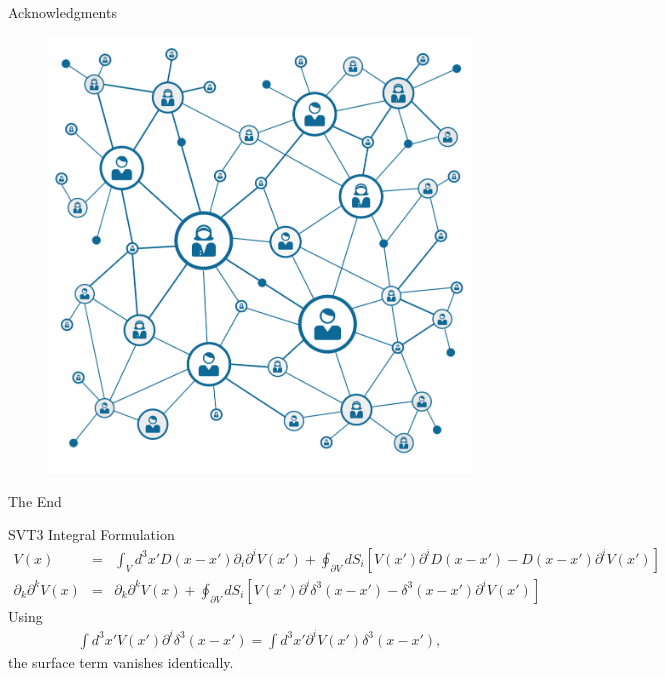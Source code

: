 \documentclass[8pt,aspectratio=1610]{beamer}
\begin{document}
\begin{frame}{Acknowledgments}
	\begin{figure}
		\includegraphics[width=0.35\linewidth]{network.png}
	\end{figure}
	\let\thefootnote\relax{}
\end{frame}


\begin{frame}{}
	\begin{center}
		\Large{The End}
	\end{center}
\end{frame}

\appendix


\begin{frame}{SVT3 Integral Formulation}
	\begin{eqnarray}
	V(x) &=&\int_V d^3x' D(x-x')\partial_i \partial^i V(x') + \oint_{\partial V} dS_i[V(x')\partial^i D(x-x') - D(x-x')\partial^i V(x')]
	\\ 
	\partial_k \partial^k V(x) &=& \partial_k \partial^k V(x) + \oint_{\partial V} dS_i[V(x')\partial^i \delta^3(x-x') - \delta^3(x-x')\partial^i V(x')]
	\end{eqnarray}
	Using 
	\begin{eqnarray}
	\int d^3x' V(x') \partial^i \delta^3(x-x') = \int d^3x' \partial^i V(x') \delta^3(x-x'),
	\end{eqnarray}
	the surface term vanishes identically.
\end{frame}
\end{document}
